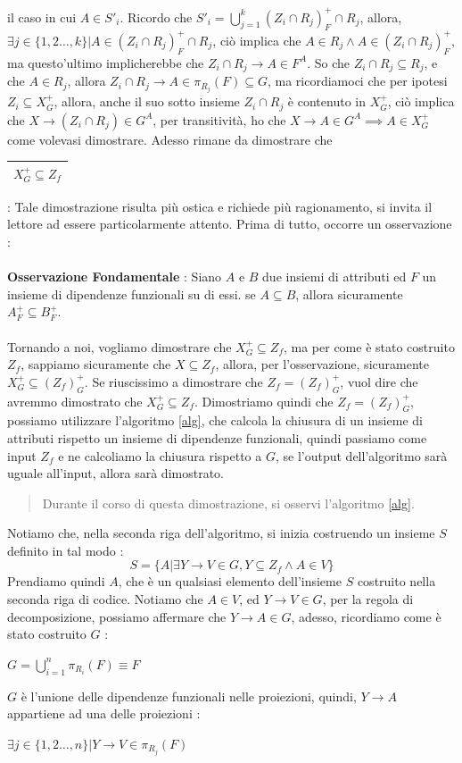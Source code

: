 \documentclass[12pt, letterpaper]{article}
\newcommand{\acc}{\\\hphantom{}\\}
\newcommand{\boxedMath}[1]{\begin{tabular}{|c|}\hline \texttt{#1} \\ \hline\end{tabular} :}
\begin{document}
il caso in cui \(A\in S'_i\). Ricordo che \(S'_i=\bigcup_{j=1}^k(Z_i\cap R_j)_F^+\cap R_j\), allora, \(\exists j\in\{1,2\dots,k\}|
A\in (Z_i\cap R_j)_F^+\cap R_j\), ciò implica che \(A\in R_j\land A\in(Z_i\cap R_j)^+_F\), ma questo'ultimo implicherebbe che 
\(Z_i\cap R_j\rightarrow A\in F^A\). So che \(Z_i\cap R_j\subseteq R_j\), e che  \(A\in R_j\), allora   
\(Z_i\cap R_j\rightarrow A\in \pi_{R_j}(F)\subseteq G\), ma ricordiamoci che per ipotesi \(Z_i\subseteq X_G^+\), allora, anche il suo 
sotto insieme \(Z_i\cap R_j\) è contenuto in \(X_G^+\), ciò implica che \(X\rightarrow (Z_i\cap R_j) \in G^A\), per transitività, 
ho che \(X\rightarrow A\in G^A\implies A\in X_G^+\) come volevasi dimostrare. Adesso rimane da dimostrare che \boxedMath{\(X_G^+\subseteq Z_f\)}
Tale dimostrazione risulta più ostica e richiede più ragionamento, si invita il lettore ad essere particolarmente attento. Prima 
di tutto, occorre un osservazione  :\acc 
\textbf{Osservazione Fondamentale} : Siano \(A\) e \(B\) due insiemi di attributi ed \(F\) un insieme di 
dipendenze funzionali su di essi. se \(A\subseteq B\), allora sicuramente \(A^+_F\subseteq B^+_F\).\acc 
Tornando a noi, vogliamo dimostrare che \(X_G^+\subseteq Z_f\), ma per come è stato costruito \(Z_f\), sappiamo 
sicuramente che \(X\subseteq Z_f\), allora, per l'osservazione, sicuramente \(X_G^+\subseteq (Z_f)_G^+\). Se riuscissimo 
a dimostrare che \(Z_f=(Z_f)_G^+\), vuol dire che avremmo dimostrato che \(X_G^+\subseteq Z_f\).
Dimostriamo quindi che \(Z_f=(Z_f)_G^+\), possiamo utilizzare l'algoritmo \ref{alg}, che calcola la chiusura 
di un insieme di attributi rispetto un insieme di dipendenze funzionali, quindi passiamo come input \(Z_f\) e ne calcoliamo 
la chiusura rispetto a \(G\), se l'output dell'algoritmo sarà uguale all'input, allora sarà dimostrato.\begin{quote}
    Durante il corso di questa dimostrazione, si osservi l'algoritmo  \ref{alg}.
\end{quote}
Notiamo che, nella seconda riga dell'algoritmo, si inizia costruendo un insieme \(S\) definito in tal modo : \begin{equation}
    S=\{A|\exists Y\rightarrow V\in G,Y\subseteq Z_f\land A\in V\}
\end{equation}
Prendiamo quindi \(A\), che è un qualsiasi elemento dell'insieme \(S\) costruito nella seconda riga di codice. Notiamo che 
\(A\in V\), ed \(Y\rightarrow V\in G\), per la regola di decomposizione, possiamo affermare che \(Y\rightarrow A\in G\), adesso, ricordiamo 
come è stato costruito \(G\) :\begin{center}
    
    \(G=\displaystyle\bigcup^n_{i=1}\pi_{R_i}(F)\equiv F\)
\end{center} 
\(G\) è l'unione delle dipendenze funzionali nelle proiezioni, quindi, \(Y\rightarrow A\) appartiene ad una delle proiezioni : \begin{center}
    \(\exists j\in\{1,2\dots,n\}|Y\rightarrow V\in \pi_{R_j}(F)\)
\end{center}
\end{document}
